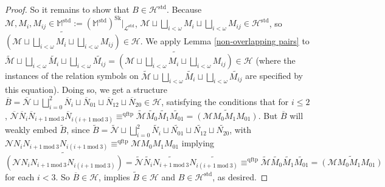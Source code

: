 \documentclass{amsart}
\theoremstyle{definition}
\theoremstyle{remark}
\numberwithin{equation}{section}
\begin{document}
\begin{proof}
     So it remains to show that $B \in \mathcal{H}^{\mathrm{std}}$. Because $\mathcal{M}, M_{i}, M_{ij} \in \mathbb{M}^{\mathrm{std}} :=(\mathbb{M}^{\mathrm{std}})^{\mathrm{Sk}}|_{\mathcal{L}^{\mathrm{std}}}$, $\mathcal{M} \sqcup \bigsqcup_{i < \omega} M_{i}  \sqcup \bigsqcup_{i < \omega} M_{ij} \in \mathcal{H}^{\mathrm{std}}$, so $\widetilde{\left(\mathcal{M} \sqcup \bigsqcup_{i < \omega} M_{i}  \sqcup \bigsqcup_{i < \omega} M_{ij}\right)} \in \mathcal{H}$. We apply Lemma \ref{non-overlapping pairs} to $\tilde{\mathcal{M}} \sqcup \bigsqcup_{i < \omega} \tilde{M_{i}}  \sqcup \bigsqcup_{i < \omega} \tilde{M_{ij}} = \widetilde{\left(\mathcal{M} \sqcup \bigsqcup_{i < \omega} M_{i}  \sqcup \bigsqcup_{i < \omega} M_{ij}\right)} \in \mathcal{H}$ (where the instances of the relation symbols on $\tilde{\mathcal{M}} \sqcup \bigsqcup_{i < \omega} \tilde{M_{i}}  \sqcup \bigsqcup_{i < \omega} \tilde{M_{ij}}$ are specified by this equation). Doing so, we get a structure $\overline{B} = \overline{\mathcal{N}} \sqcup \bigsqcup^{2}_{i=0} \overline{N}_{i} \sqcup \overline{N}_{01} \sqcup \overline{N}_{12} \sqcup \overline{N}_{20} \in \mathcal{H}$, satisfying the conditions that for $i \leq 2$, $\overline{\mathcal{N}} \overline{N}_{i}\overline{N}_{i+1 \mathrm{\: mod \:} 3} \overline{N}_{i(i+1 \mathrm{\: mod \:} 3)} \equiv^{\mathrm{qftp}} \tilde{\mathcal{M}}\tilde{M_{0}}\tilde{M_{1}}\tilde{M_{01}} = \widetilde{\left(\mathcal{M}M_{0}M_{1}M_{01}\right)}$. But $\overline{B}$ will weakly embed $\tilde{B}$, since $\tilde{B}= \tilde{\mathcal{N}} \sqcup \bigsqcup^{2}_{i=0} \tilde{N_{i}} \sqcup \tilde{N_{01}} \sqcup \tilde{N_{12}} \sqcup \tilde{N_{20}}$, with $\mathcal{N} N_{i}N_{i+1 \mathrm{\: mod \:} 3} N_{i(i+1 \mathrm{\: mod \:} 3)}\equiv^{\mathrm{qftp}} \mathcal{M}M_{0}M_{1}M_{01}$ implying $\widetilde{\left(\mathcal{N} N_{i}N_{i+1 \mathrm{\: mod \:} 3} N_{i(i+1 \mathrm{\: mod \:} 3)}\right)}=\tilde{\mathcal{N}} \tilde{N_{i}}\widetilde{N_{i+1 \mathrm{\: mod \:} 3}}\widetilde{ N_{i(i+1 \mathrm{\: mod \:} 3)}} \equiv^{\mathrm{qftp}} \tilde{\mathcal{M}}\tilde{M_{0}}\tilde{M_{1}}\tilde{M_{01}} = \widetilde{\left(\mathcal{M}M_{0}M_{1}M_{01}\right)}$ for each $i < 3$. So $\overline{B} \in \mathcal{H}$, implies $\tilde{B} \in \mathcal{H}$ and $B \in \mathcal{H}^{\mathrm{std}}$, as desired.


\end{proof}
\end{document}
